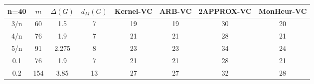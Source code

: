 \begin{tabular}{||c||ccc||cccc||}
 \hline \hline 
 n=40&$m$&$\Delta (G)$&$d_M(G)$& Kernel-VC & ARB-VC & 2APPROX-VC & MonHeur-VC\\ \hline \hline
3/n&60&1.5&7&19&19&30&20\\
4/n&76&1.9&7&21&21&28&21\\
5/n&91&2.275&8&23&23&34&24\\
0.1&76&1.9&7&21&21&28&21\\
0.2&154&3.85&13&27&27&32&28\\
\hline \end{tabular}

